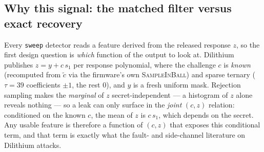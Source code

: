 \documentclass[11pt]{article}
\newcommand{\code}[1]{\texttt{#1}}
\begin{document}
\subsection{Why this signal: the matched filter versus exact recovery}\label{sec:whysignal}

Every \code{sweep} detector reads a feature derived from the released response $z$,
so the first design question is \emph{which} function of the output to look at.
Dilithium publishes $z = y + c\,s_1$ per response polynomial, where the challenge
$c$ is \emph{known} (recomputed from $\tilde c$ via the firmware's own
\textsc{SampleInBall}) and sparse ternary ($\tau=39$ coefficients $\pm1$, the rest
$0$), and $y$ is a fresh uniform mask. Rejection sampling makes the \emph{marginal}
of $z$ secret-independent --- a histogram of $z$ alone reveals nothing --- so a leak
can only surface in the \emph{joint} $(c,z)$ relation: conditioned on the known $c$,
the mean of $z$ is $c\,s_1$, which depends on the secret. Any usable feature is
therefore a function of $(c,z)$ that exposes this conditional term, and that term is
exactly what the fault- and side-channel literature on Dilithium attacks.
\end{document}
